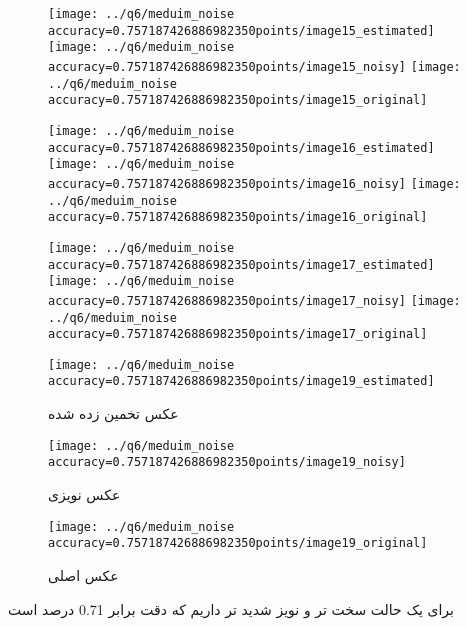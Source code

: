 \documentclass[a4paper,12pt]{article}
\begin{document}
\begin{figure}[!htb]
  \texttt{[image: ../q6/meduim\_noise accuracy=0.757187426886982350points/image15\_estimated]}
\endminipage\hfill
{}
  \texttt{[image: ../q6/meduim\_noise accuracy=0.757187426886982350points/image15\_noisy]}
\endminipage\hfill
{}
  \texttt{[image: ../q6/meduim\_noise accuracy=0.757187426886982350points/image15\_original]}
\endminipage\hfill

  \texttt{[image: ../q6/meduim\_noise accuracy=0.757187426886982350points/image16\_estimated]}
\endminipage\hfill
{}
  \texttt{[image: ../q6/meduim\_noise accuracy=0.757187426886982350points/image16\_noisy]}
\endminipage\hfill
{}
  \texttt{[image: ../q6/meduim\_noise accuracy=0.757187426886982350points/image16\_original]}
\endminipage\hfill

  \texttt{[image: ../q6/meduim\_noise accuracy=0.757187426886982350points/image17\_estimated]}
\endminipage\hfill
{}
  \texttt{[image: ../q6/meduim\_noise accuracy=0.757187426886982350points/image17\_noisy]}
\endminipage\hfill
{}
  \texttt{[image: ../q6/meduim\_noise accuracy=0.757187426886982350points/image17\_original]}
\endminipage\hfill

  \texttt{[image: ../q6/meduim\_noise accuracy=0.757187426886982350points/image19\_estimated]}
  \caption{  عکس تخمین زده شده }
\endminipage\hfill
{}
  \texttt{[image: ../q6/meduim\_noise accuracy=0.757187426886982350points/image19\_noisy]}
  \caption{  عکس نویزی }
\endminipage\hfill
{}
  \texttt{[image: ../q6/meduim\_noise accuracy=0.757187426886982350points/image19\_original]}
  \caption{  عکس اصلی }
\endminipage\hfill
\end{figure}


برای یک حالت سخت تر و نویز شدید تر داریم که دقت برابر 0.71 درصد است 
\end{document}
